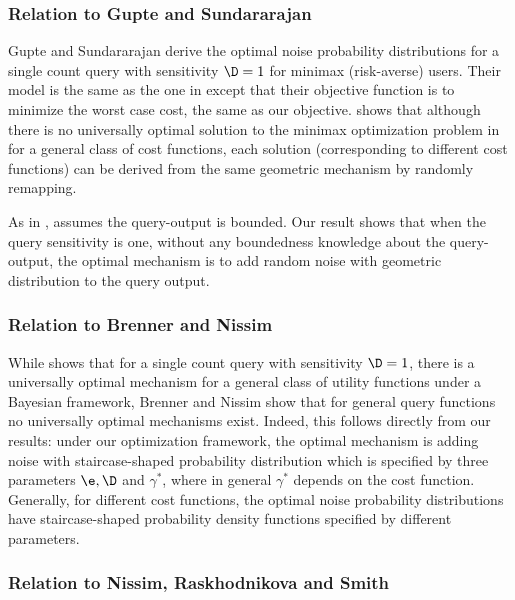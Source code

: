 \subsubsection{Relation to  Gupte and Sundararajan  \cite{minimax10}  }

  Gupte and Sundararajan \cite{minimax10} derive the optimal noise probability distributions for a single count query with sensitivity $\D = 1$ for minimax (risk-averse) users. Their model is the same as the one in \cite{Ghosh09} except that their objective function is to minimize the worst case cost, the same as our objective.  \cite{minimax10} shows that although there is no universally optimal solution to the minimax optimization problem in \cite{minimax10} for a general class of cost functions, each solution (corresponding to different cost functions) can be derived from the same geometric mechanism by randomly remapping.

  As in \cite{Ghosh09}, \cite{minimax10} assumes the query-output is bounded. Our result shows that when the query sensitivity is one, without any boundedness knowledge about the query-output, the optimal mechanism is to add random noise with geometric distribution to the query output.


\subsubsection{Relation to Brenner and Nissim  \cite{Nissim10}  }

While \cite{Ghosh09} shows that  for a single count query with sensitivity $\D = 1$, there is a universally optimal mechanism for a general class of utility functions  under a Bayesian framework, Brenner and Nissim  \cite{Nissim10}  show that for general query functions no universally optimal mechanisms exist. Indeed, this follows directly from our results:  under our optimization framework, the optimal mechanism is adding noise with staircase-shaped probability distribution which is specified by three parameters $\e, \D$ and $\gamma^*$, where in general $\gamma^*$ depends on the cost function.  Generally, for different cost functions, the optimal noise probability distributions have staircase-shaped probability density functions specified by different parameters.


\subsubsection{Relation to   Nissim, Raskhodnikova and Smith \cite{NRS07}  }

